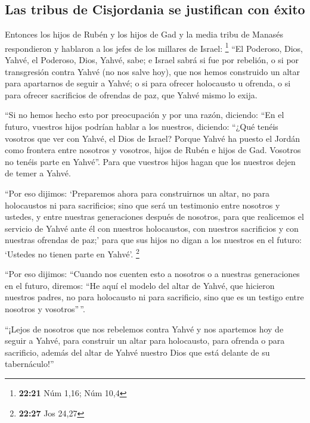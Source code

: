 \hypertarget{las-tribus-de-cisjordania-se-justifican-con-uxe9xito}{%
\subsection{Las tribus de Cisjordania se justifican con
éxito}\label{las-tribus-de-cisjordania-se-justifican-con-uxe9xito}}

 Entonces los hijos de Rubén y los hijos de Gad y la
media tribu de Manasés respondieron y hablaron a los jefes de los
millares de Israel: \footnote{\textbf{22:21} Núm 1,16; Núm 10,4}
 ``El Poderoso, Dios, Yahvé, el Poderoso, Dios, Yahvé,
sabe; e Israel sabrá si fue por rebelión, o si por transgresión contra
Yahvé (no nos salve hoy),  que nos hemos construido un
altar para apartarnos de seguir a Yahvé; o si para ofrecer holocausto u
ofrenda, o si para ofrecer sacrificios de ofrendas de paz, que Yahvé
mismo lo exija.

 ``Si no hemos hecho esto por preocupación y por una
razón, diciendo: ``En el futuro, vuestros hijos podrían hablar a los
nuestros, diciendo: ``¿Qué tenéis vosotros que ver con Yahvé, el Dios de
Israel?  Porque Yahvé ha puesto el Jordán como frontera
entre nosotros y vosotros, hijos de Rubén e hijos de Gad. Vosotros no
tenéis parte en Yahvé''. Para que vuestros hijos hagan que los nuestros
dejen de temer a Yahvé.

 ``Por eso dijimos: `Preparemos ahora para construirnos
un altar, no para holocaustos ni para sacrificios;  sino
que será un testimonio entre nosotros y ustedes, y entre nuestras
generaciones después de nosotros, para que realicemos el servicio de
Yahvé ante él con nuestros holocaustos, con nuestros sacrificios y con
nuestras ofrendas de paz;' para que sus hijos no digan a los nuestros en
el futuro: `Ustedes no tienen parte en Yahvé'. \footnote{\textbf{22:27}
  Jos 24,27}

 ``Por eso dijimos: ``Cuando nos cuenten esto a nosotros
o a nuestras generaciones en el futuro, diremos: ``He aquí el modelo del
altar de Yahvé, que hicieron nuestros padres, no para holocausto ni para
sacrificio, sino que es un testigo entre nosotros y vosotros''\,''.

 ``¡Lejos de nosotros que nos rebelemos contra Yahvé y
nos apartemos hoy de seguir a Yahvé, para construir un altar para
holocausto, para ofrenda o para sacrificio, además del altar de Yahvé
nuestro Dios que está delante de su tabernáculo!''

